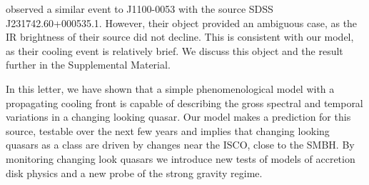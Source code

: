\documentclass{nature}
\begin{document}
\cite{Guo2016} observed a similar event to J1100-0053 with the source
SDSS J231742.60+000535.1. However, their object provided an ambiguous
case, as the IR brightness of their source did not decline. This is consistent with our model, as their cooling event is
relatively brief.  We discuss this object and the \cite{Guo2016} result
further in the Supplemental Material. 

In this letter, we have shown that a simple phenomenological model
with a propagating cooling front is capable of describing the gross
spectral and temporal variations in a changing looking quasar. Our
model makes a prediction for this source, testable over the next few
years and implies that changing looking quasars as a class are driven
by changes near the ISCO, close to the SMBH. By monitoring changing
look quasars we introduce new tests of models of accretion disk
physics and a new probe of the strong gravity regime.




%

\end{document}
